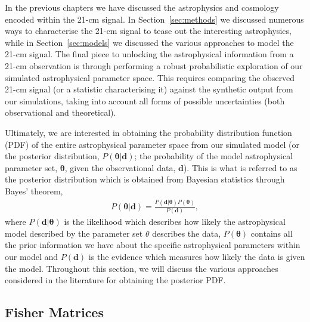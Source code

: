 In the previous chapters we have discussed the astrophysics and cosmology encoded within the 21-cm signal. In Section~\ref{sec:methods} we discussed numerous ways to characterise the 21-cm signal to tease out the interesting astrophysics, while in Section~\ref{sec:models} we discussed the various approaches to model the 21-cm signal. The final piece to unlocking the astrophysical information from a 21-cm observation is through performing a robust probabilistic exploration of our simulated astrophysical parameter space. This requires comparing the observed 21-cm signal (or a statistic characterising it) against the synthetic output from our simulations, taking into account all forms of possible uncertainties (both observational and theoretical). 

Ultimately, we are interested in obtaining the probability distribution function (PDF) of the entire astrophysical parameter space from our simulated model (or the posterior distribution, $P(\mathbf{\theta}|\mathbf{d})$; the probability of the model astrophysical parameter set, $\mathbf{\theta}$, given the observational data, $\mathbf{d}$). This is what is referred to as the posterior distribution which is obtained from Bayesian statistics through Bayes' theorem,
\begin{eqnarray} \label{eq:Bayes}
P(\mathbf{\theta}|\mathbf{d}) = \frac{P(\mathbf{\mathbf{d}|\theta})P(\mathbf{\theta})}{P(\mathbf{d})},
\end{eqnarray}
where $P(\mathbf{\mathbf{d}|\theta})$ is the likelihood which describes how likely the astrophysical model described by the parameter set $\theta$ describes the data, $P(\mathbf{\theta})$ contains all the prior information we have about the specific astrophysical parameters within our model and $P(\mathbf{d})$ is the evidence which measures how likely the data is given the model. Throughout this section, we will discuss the various approaches considered in the literature for obtaining the posterior PDF. 

\subsection{Fisher Matrices}

